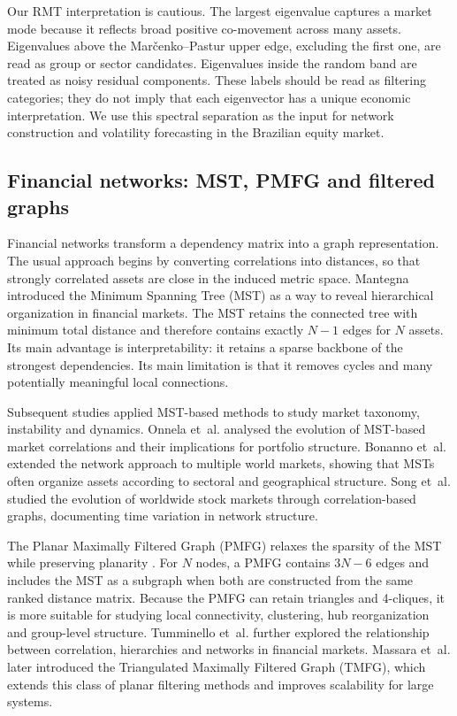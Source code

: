 Our RMT interpretation is cautious. The largest eigenvalue captures a market mode because it reflects broad positive co-movement across many assets. Eigenvalues above the Mar\v{c}enko--Pastur upper edge, excluding the first one, are read as group or sector candidates. Eigenvalues inside the random band are treated as noisy residual components. These labels should be read as filtering categories; they do not imply that each eigenvector has a unique economic interpretation. We use this spectral separation as the input for network construction and volatility forecasting in the Brazilian equity market.

\subsection{Financial networks: MST, PMFG and filtered graphs}

Financial networks transform a dependency matrix into a graph representation. The usual approach begins by converting correlations into distances, so that strongly correlated assets are close in the induced metric space. Mantegna \cite{mantegna_1999_hierarchical} introduced the Minimum Spanning Tree (MST) as a way to reveal hierarchical organization in financial markets. The MST retains the connected tree with minimum total distance and therefore contains exactly $N-1$ edges for $N$ assets. Its main advantage is interpretability: it retains a sparse backbone of the strongest dependencies. Its main limitation is that it removes cycles and many potentially meaningful local connections.

Subsequent studies applied MST-based methods to study market taxonomy, instability and dynamics. Onnela et~al. \cite{onnela_2003_dynamics} analysed the evolution of MST-based market correlations and their implications for portfolio structure. Bonanno et~al. \cite{bonanno_2004_networks} extended the network approach to multiple world markets, showing that MSTs often organize assets according to sectoral and geographical structure. Song et~al. \cite{song_2012_evolution} studied the evolution of worldwide stock markets through correlation-based graphs, documenting time variation in network structure.

The Planar Maximally Filtered Graph (PMFG) relaxes the sparsity of the MST while preserving planarity \cite{tumminello_2005_tool}. For $N$ nodes, a PMFG contains $3N-6$ edges and includes the MST as a subgraph when both are constructed from the same ranked distance matrix. Because the PMFG can retain triangles and 4-cliques, it is more suitable for studying local connectivity, clustering, hub reorganization and group-level structure. Tumminello et~al. \cite{tumminello_2010_correlation} further explored the relationship between correlation, hierarchies and networks in financial markets. Massara et~al. \cite{massara_2016_tmfg} later introduced the Triangulated Maximally Filtered Graph (TMFG), which extends this class of planar filtering methods and improves scalability for large systems.


